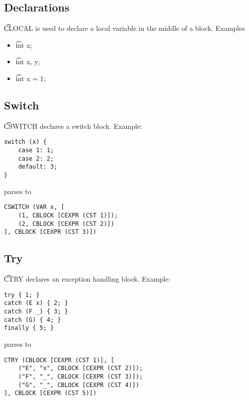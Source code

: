 \subsection{Declarations}
\t{CLOCAL} is used to declare a local variable in the middle of a block.
Examples
\begin{itemize}
    \item \t{int x;} \to\ 
    \item \t{int x, y;} \to\ 
    \item \t{int x = 1;} \to\ 
\end{itemize}

\subsection{Switch}
\t{CSWITCH} declares a switch block.
Example:
\begin{verbatim}
switch (x) {
    case 1: 1;
    case 2: 2;
    default: 3;
}
\end{verbatim}
parses to
\begin{verbatim}
CSWITCH (VAR x, [
    (1, CBLOCK [CEXPR (CST 1)]);
    (2, CBLOCK [CEXPR (CST 2)])
], CBLOCK [CEXPR (CST 3)])
\end{verbatim}

\subsection{Try}
\t{CTRY} declares an exception handling block.
Example:
\begin{verbatim}
try { 1; }
catch (E x) { 2; }
catch (F _) { 3; }
catch (G) { 4; }
finally { 5; }
\end{verbatim}
parses to
\begin{verbatim}
CTRY (CBLOCK [CEXPR (CST 1)], [
    ("E", "x", CBLOCK [CEXPR (CST 2)]);
    ("F", "_", CBLOCK [CEXPR (CST 3)]);
    ("G", "_", CBLOCK [CEXPR (CST 4)])
], CBLOCK [CEXPR (CST 5)])
\end{verbatim}

